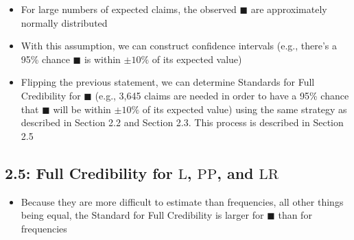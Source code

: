 \documentclass[
]{article}
\providecommand{\tightlist}{%
  \setlength{\itemsep}{0pt}\setlength{\parskip}{0pt}}
\begin{document}
\begin{orange}
\begin{itemize}
\item
  For large numbers of expected claims, the observed \(\blacksquare\)
  are approximately normally distributed
\item
  With this assumption, we can construct confidence intervals (e.g.,
  there's a 95\% chance \(\blacksquare\) is within \(\pm 10\%\) of its
  expected value)
\item
  Flipping the previous statement, we can determine Standards for Full
  Credibility for \(\blacksquare\) (e.g., 3,645 claims are needed in
  order to have a 95\% chance that \(\blacksquare\) will be within
  \(\pm 10\%\) of its expected value) using the same strategy as
  described in Section 2.2 and Section 2.3. This process is described in
  Section 2.5
\end{itemize}

\end{orange}

\hypertarget{full-credibility-for-textl-textpp-and-textlr}{%
\subsection{\texorpdfstring{2.5: Full Credibility for \(\text{L}\),
\(\text{PP}\), and
\(\text{LR}\)}{2.5: Full Credibility for \textbackslash text\{L\}, \textbackslash text\{PP\}, and \textbackslash text\{LR\}}}\label{full-credibility-for-textl-textpp-and-textlr}}

\begin{itemize}
\tightlist
\item
  Because they are more difficult to estimate than frequencies, all
  other things being equal, the Standard for Full Credibility is larger
  for \(\blacksquare\) than for frequencies
\end{itemize}
\end{document}
